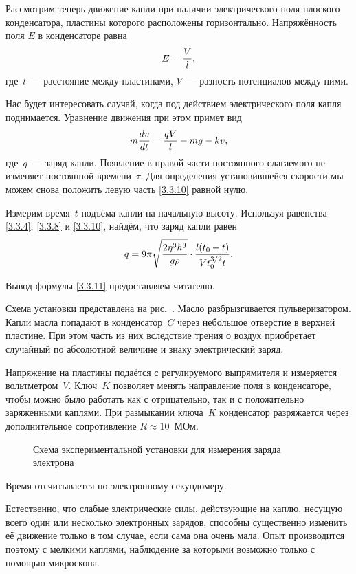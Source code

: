 Рассмотрим теперь движение капли при наличии электрического поля плоского
конденсатора, пластины которого расположены горизонтально. Напряжённость поля
$E$ в конденсаторе равна
\begin{equation}
	E=\frac{V}{l},
	\eqmark{3.3.9}
\end{equation}
где~$l$~--- расстояние между пластинами, $V$~--- разность потенциалов между
ними.

Нас будет интересовать случай, когда под действием электрического поля капля
поднимается. Уравнение движения при этом примет вид
\begin{equation}
	m\frac{dv}{dt}=\frac{qV}{l}-mg -kv,
	\eqmark{3.3.10}
\end{equation}
где~$q$~--- заряд капли. Появление в правой части постоянного слагаемого не
изменяет постоянной времени~$\tau$. Для
определения установившейся скорости мы можем снова положить левую часть
\eqref{3.3.10} равной нулю.

Измерим время~$t$ подъёма капли на начальную высоту. Используя равенства
\eqref{3.3.4}, \eqref{3.3.8} и \eqref{3.3.10}, найдём, что заряд капли равен
\begin{equation}
	q=9\pi\sqrt{\frac{2\eta^3 h^3}{g \rho}}\cdot\frac{l(t_0+t)}{Vt_0^{3/2} t}.
	\eqmark{3.3.11}
\end{equation}

Вывод формулы \eqref{3.3.11} предоставляем читателю.

\experiment Схема установки представлена на рис.~. Масло
разбрызгивается пульверизатором. Капли масла попадают в конденсатор~$C$ через
небольшое отверстие в верхней пластине. При этом часть из них вследствие трения
о воздух приобретает случайный по абсолютной величине и знаку электрический
заряд.

Напряжение на пластины подаётся с регулируемого выпрямителя и измеряется
вольтметром~$V$. Ключ~$K$ позволяет менять направление поля в конденсаторе,
чтобы можно было работать  как с отрицательно, так и с положительно заряженными
каплями. При размыкании ключа~$K$ конденсатор разряжается через дополнительное
сопротивление $R\approx 10$~МОм.
\begin{figure}[h!]
	\caption{Схема экспериментальной установки для измерения заряда электрона}
\end{figure}
Время отсчитывается по электронному секундомеру.

Естественно, что слабые электрические силы, действующие на каплю, несущую всего
один или несколько электронных зарядов, способны существенно изменить её
движение только в том случае, если сама она очень мала. Опыт производится
поэтому с мелкими каплями, наблюдение за которыми возможно только с помощью
микроскопа.

